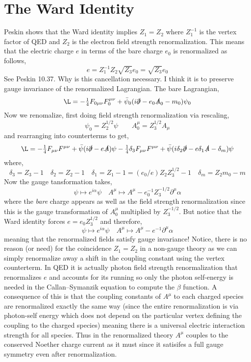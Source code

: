 \documentclass[12pt]{article}
\begin{document}
\section{The Ward Identity}

Peskin shows that the Ward identity implies $Z_1 = Z_2$ where $Z_1^{-1}$ is the vertex factor of QED and $Z_2$ is the electron field strength renormalization. This means that the electric charge $e$ in terms of the bare charge $e_0$ is renormalized as follows,
\[ e = Z_1^{-1} Z_2 \sqrt{Z_3} e_0 = \sqrt{Z_3} e_0 \]
See Peskin 10.37. Why is this cancellation necessary. I think it is to preserve gauge invariance of the renormalized Lagrangian. The bare Lagrangian,
\[ \L = -\tfrac{1}{4} F_{0 \mu \nu} F_0^{\mu \nu} + \bar{\psi}_0(i \slashed{\partial} - e_0 \slashed{A}_{0} - m_0) \psi_0 \]
Now we renomalize, first doing field strength renormalization via rescaling,
\[ \psi_0 = Z_2^{1/2} \psi \quad \quad A_0^\mu = Z_3^{1/2} A_\mu \]
and rearranging into counterterms to get,
\[ \L = - \tfrac{1}{4} F_{\mu \nu} F^{\mu \nu} + \bar{\psi}( i \slashed{\partial} - e \slashed{A})\psi  - \tfrac{1}{4} \delta_3 F_{\mu \nu} F^{\mu \nu} + \bar{\psi}( i \delta_2 \slashed{\partial} - e \delta_1 \slashed{A} - \delta_m)\psi
\]
where,
\[ \delta_3 = Z_3 - 1 \quad \delta_2 = Z_2 - 1 \quad \delta_1 = Z_1 - 1 = (e_0/e) Z_2 Z_3^{1/2} - 1 \quad \delta_m = Z_2 m_0 - m \]
Now the gauge tansformation takes,
\[ \psi \mapsto e^{i \alpha} \psi \quad A^\mu \mapsto A^\mu - e_0^{-1} Z_3^{-1/2} \partial^\mu \alpha \]
where the \textit{bare} charge appears as well as the field strength renormalization since this is the gauge transformation of $A_0^{\mu}$ multiplied by $Z_{3}^{-1/2}$. But notice that the Ward identity forces $e = e_0 Z_3^{1/2}$ and therefore,
\[ \psi \mapsto e^{i \alpha} \psi \quad A^\mu \mapsto A^\mu - e^{-1} \partial^\mu \alpha \]
meaning that the renormalized fields satisfy gauge invariance! Notice, there is no reason (or need) for the coincidence $Z_1 = Z_2$ in a non-gauge theory as we can simply renormalize away a shift in the coupling constant using the vertex counterterm. In QED it is actually photon field strength renormalization that renormalizes $e$ and accounts for its running so only the photon self-energy is needed in the Callan–Symanzik equation to compute the $\beta$ function. A consequence of this is that the coupling constants of $A^\mu$ to each charged species are renormalized exactly the same way (since the entire renormalization is via photon-self energy which does not depend on the particular vertex defining the coupling to the charged species) meaning there is a universal electric interaction strength for all species. Thus in the renormalized theory $A^\mu$ couples to the conserved Noether charge current as it must since it satisifes a full gauge symmetry even after renormalization. 
\end{document}
